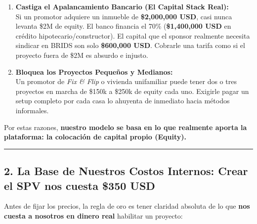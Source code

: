 \documentclass[
]{article}
\providecommand{\tightlist}{%
  \setlength{\itemsep}{0pt}\setlength{\parskip}{0pt}}
\begin{document}
\begin{enumerate}
\def\labelenumi{\arabic{enumi}.}
\tightlist
\item
  \textbf{Castiga el Apalancamiento Bancario (El Capital Stack Real):}\\
  Si un promotor adquiere un inmueble de \textbf{\$2,000,000 USD}, casi
  nunca levanta \$2M de equity. El banco financia el 70\%
  (\textbf{\$1,400,000 USD} en crédito hipotecario/constructor). El
  capital que el sponsor realmente necesita sindicar en BRIDS son solo
  \textbf{\$600,000 USD}. Cobrarle una tarifa como si el proyecto fuera
  de \$2M es absurdo e injusto.
\item
  \textbf{Bloquea los Proyectos Pequeños y Medianos:}\\
  Un promotor de \emph{Fix \& Flip} o vivienda unifamiliar puede tener
  dos o tres proyectos en marcha de \$150k a \$250k de equity cada uno.
  Exigirle pagar un setup completo por cada casa lo ahuyenta de
  inmediato hacia métodos informales.
\end{enumerate}

Por estas razones, \textbf{nuestro modelo se basa en lo que realmente
aporta la plataforma: la colocación de capital propio (Equity).}

\begin{center}\rule{0.5\linewidth}{0.5pt}\end{center}

\subsection{2. La Base de Nuestros Costos Internos: Crear el SPV nos
cuesta \$350
USD}\label{la-base-de-nuestros-costos-internos-crear-el-spv-nos-cuesta-350-usd}

Antes de fijar los precios, la regla de oro es tener claridad absoluta
de lo que \textbf{nos cuesta a nosotros en dinero real} habilitar un
proyecto:
\end{document}
